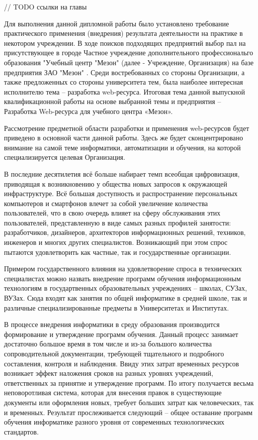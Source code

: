 
// TODO ссылки на главы

Для выполнения данной дипломной работы было установлено требование практического применения (внедрения) результата деятельности на практике в некотором учреждении. В ходе поисков подходящих предприятий выбор пал на присутствующее в городе Частное учреждение дополнительного профессиональго образования "Учебный центр "Мезон" \cite{uc-meson} (далее - Учреждение, Организация) на базе предприятия ЗАО "Мезон" \cite{meson}. Среди востребованных со стороны Организации, а также предложенных со стороны университета тем, была наиболее интересная исполнителю тема -- разработка web-ресурса. Итоговая тема данной выпускной квалификационной работы на основе выбранной темы и предприятия -- Разработка Web-ресурса для учебного центра «Мезон».

Рассмотрение предметной области разработки и применения web-ресурсов будет приведено в основной части данной работы. Здесь же будет сконцентрировано внимание на самой теме информатики, автоматизации и обучения, на которой специализируется целевая Организация.

В последние десятилетия всё больше набирает темп всеобщая цифровизация, приводящая к возникновению у общества новых запросов к окружающей инфраструктуре.
Всё большая доступность и распространение персональных компьютеров и смартфонов влечет за собой увеличение количества пользователей, что в свою очередь влияет на сферу обслуживания этих пользователей, представленную в виде самых разных профилей занятости: разработчиков, дизайнеров, архитекторов информационных решений, техников, инженеров и многих других специалистов.
Возникающий при этом спрос пытаются удовлетворить как частные, так и государственные организации.

Примером государственного влияния на удовлетворение спроса в технических специалистах можно назвать внедрение программ обучения информационным технологиям в государтвенных образовательных учреждениях -- школах, СУЗах, ВУЗах.
Сюда входят как занятия по общей информатике в средней школе, так и различные специализированные предметы в Университетах и Институтах.

В процессе внедрения информатики в среду образования производится формирование и утверждение программ обучения.
Данный процесс занимает достаточно большое время в том числе и из-за большого количества сопроводительной документации, требующей тщательного и подробного составления, контроля и наблюдения.
Ввиду этих затрат временных ресурсов возникает эффект наложения сроков на разных уровнях учреждений, ответственных за принятие и утверждение программ.
По итогу получается весьма неповоротливая система, которая для внесения правок в существующие документы или оформления новых, требует больших затрат как человеческих, так и временных.
Результат прослеживается следующий -- общее оставание программ обучения информатике разного уровня от современных технологических стандартов.

